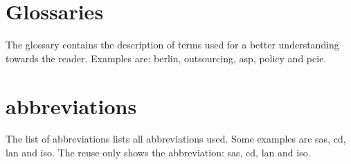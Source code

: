 \section{Glossaries}
The glossary contains the description of terms used for a better understanding towards the reader. Examples are: \gls{berlin}, \gls{outsourcing}, \gls{asp}, \gls{policy} and \gls{pcie}.


\section{abbreviations}
The list of abbreviations lists all abbreviations used. Some examples are \gls{sas}, \gls{cd}, \gls{lan} and \gls{iso}. The reuse only shows the abbreviation: \gls{sas}, \gls{cd}, \gls{lan} and \gls{iso}.
